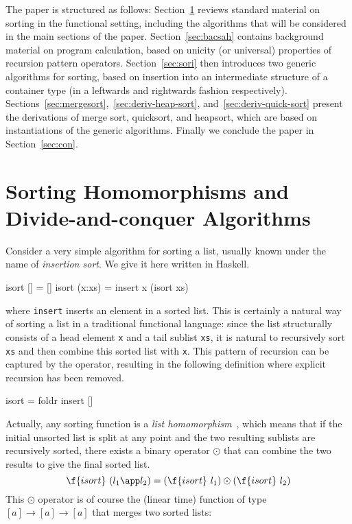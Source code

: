 \documentclass[a4paper,11pt]{llncs}
\begin{document}
The paper is structured as follows: Section~\ref{sec:sorting} reviews
standard material on sorting in the functional setting, including the
algorithms that will be considered in the main sections of the
paper. Section~\ref{sec:bacsah} contains background material on
program calculation, based on unicity (or universal) properties of
recursion pattern operators. Section~\ref{sec:sori} then introduces
two generic algorithms for sorting, based on insertion into an
intermediate structure of a container type (in a leftwards and
rightwards fashion
respectively). Sections~\ref{sec:mergesort},~\ref{sec:deriv-heap-sort},
and~\ref{sec:deriv-quick-sort} present the derivations of merge sort,
quicksort, and heapsort, which are based on instantiations of the
generic algorithms. Finally we conclude the paper in
Section~\ref{sec:con}.




\section{Sorting Homomorphisms and Divide-and-conquer Algorithms }        

\label{sec:sorting}

Consider a very simple algorithm for sorting a list, usually known
under the name of \emph{insertion sort}. We give it here written in
Haskell.
\begin{code}
isort []     = []
isort (x:xs) = insert x (isort xs) 
\end{code}
where \verb+insert+ inserts an element in a sorted list. This is
certainly a natural way of sorting a list in a traditional functional
language: since the list structurally consists of a head element
\texttt{x} and a tail sublist \texttt{xs}, it is natural to
recursively sort \texttt{xs} and then combine this sorted list with
\texttt{x}. This pattern of recursion can be captured by the
 operator, resulting in the following definition where
explicit recursion has been removed.
\begin{code}
isort = foldr insert []
\end{code}
Actually, any sorting function is a \emph{list
  homomorphism}~\cite{BirdR:inttl,GibbonsJ:thiht}, which means that if
the initial unsorted list is split at any point and the two resulting
sublists are recursively sorted, there exists a binary operator $\odot$
that can combine the two results to give the final sorted list.
$$
\f{isort}\ (l_1 \app l_2) = (\f{isort}\ l_1) \odot (\f{isort}\ l_2)
$$
This $\odot$ operator is of course the (linear time) function of type
$[a] \to [a] \to [a]$ that merges two sorted lists:
\end{document}
